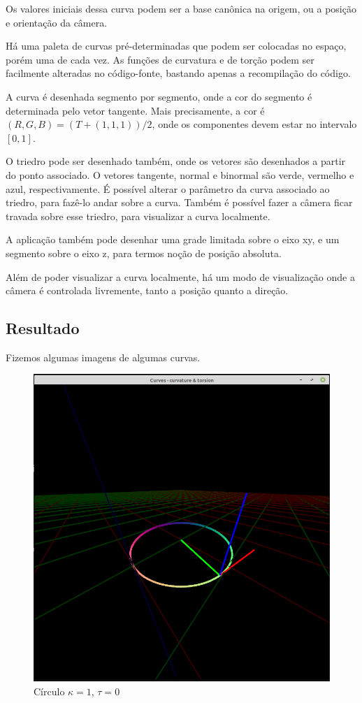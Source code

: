 \documentclass{article}
\begin{document}
Os valores iniciais dessa curva podem ser a base canônica na origem, ou a posição e orientação da câmera.

Há uma paleta de curvas pré-determinadas que podem ser colocadas no espaço, porém uma de cada vez. As funções de curvatura e de torção podem ser facilmente alteradas no código-fonte, bastando apenas a recompilação do código.

A curva é desenhada segmento por segmento, onde a cor do segmento é determinada pelo vetor tangente. Mais precisamente, a cor é $(R, G, B) = (T + (1, 1, 1))/2$, onde os componentes devem estar no intervalo $[0, 1]$.

O triedro pode ser desenhado também, onde os vetores são desenhados a partir do ponto associado. O vetores tangente, normal e binormal são verde, vermelho e azul, respectivamente. É possível alterar o parâmetro da curva associado ao triedro, para fazê-lo andar sobre a curva. Também é possível fazer a câmera ficar travada sobre esse triedro, para visualizar a curva localmente.

A aplicação também pode desenhar uma grade limitada sobre o eixo xy, e um segmento sobre o eixo z, para termos noção de posição absoluta.

Além de poder visualizar a curva localmente, há um modo de visualização onde a câmera é controlada livremente, tanto a posição quanto a direção.

\subsection{Resultado}

Fizemos algumas imagens de algumas curvas.

\begin{figure}[H]
    \centering
    \includegraphics[scale = 0.5]{img/circle.png}
    \caption{Círculo $\kappa = 1$, $\tau = 0$}
\end{figure}
\end{document}
